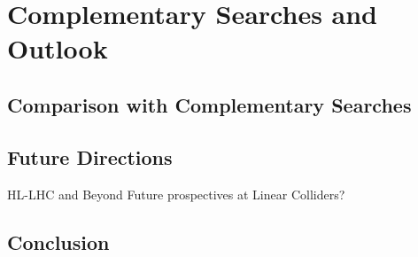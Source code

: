 
\chapter{Complementary Searches and Outlook}
\label{ch:Conclusion}
\section{Comparison with Complementary Searches}
\section{Future Directions}
HL-LHC and Beyond
Future prospectives at Linear Colliders?
\section{Conclusion}


